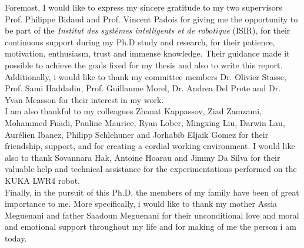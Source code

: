 \begin{acknowledgements}
Foremost, I would like to express my sincere gratitude to my two supervisors Prof. Philippe Bidaud and Prof. Vincent Padois for giving me the opportunity to be part of the \textit{Institut des syst\`emes intelligents et de robotique} (ISIR), for their continuous support during my Ph.D study and research, for their patience, motivation, enthusiasm, trust and immense knowledge. Their guidance made it possible to achieve the goals fixed for my thesis and also to write this report. \\
%

Additionally, i would like to thank my committee members Dr. Olivier Stasse, Prof. Sami Haddadin, Prof. Guillaume Morel, Dr. Andrea Del Prete and Dr. Yvan Measson for their interest in my work. \\

I am also thankful to my colleagues Zhanat Kappassov, Ziad Zamzami, Mohammed Fnadi, Pauline Maurice, Ryan Lober, Mingxing Liu, Darwin Lau, Aurélien Ibanez, Philipp Schlehuner and Jorhabib Eljaik Gomez for their friendship, support, and for creating a cordial working environment. I would like also to thank Sovannara Hak, Antoine Hoarau and Jimmy Da Silva for their valuable help and technical assistance for the experimentations performed on the KUKA LWR4 robot. \\

Finally, in the pursuit of this Ph.D, the members of my family have been of great importance to me. More specifically, i would like to thank my mother Assia Meguenani and father Saadoun Meguenani for their unconditional love and moral and emotional support throughout my life and for making of me the person i am today. 


\end{acknowledgements}
